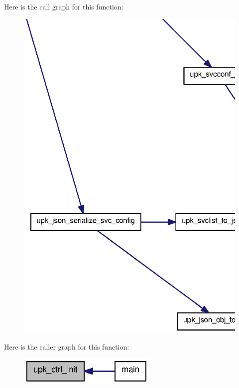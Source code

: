 Here is the call graph for this function:
\nopagebreak
\begin{figure}[H]
\begin{center}
\leavevmode
\includegraphics[width=400pt]{controller_8h_a253734ff940e671ba2bd35fc159a9471_cgraph}
\end{center}
\end{figure}




Here is the caller graph for this function:\nopagebreak
\begin{figure}[H]
\begin{center}
\leavevmode
\includegraphics[width=188pt]{controller_8h_a253734ff940e671ba2bd35fc159a9471_icgraph}
\end{center}
\end{figure}


